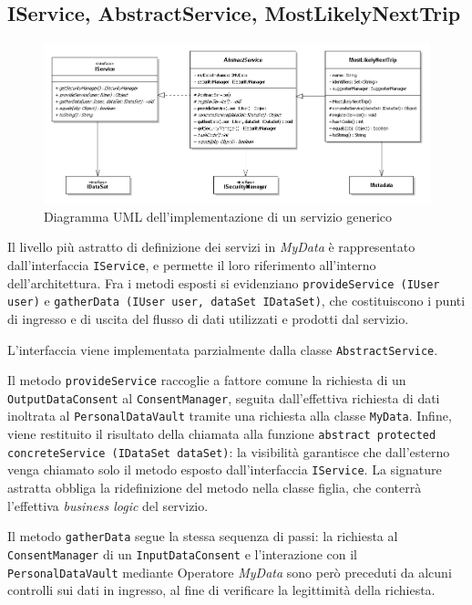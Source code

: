 \subsection{IService, AbstractService, MostLikelyNextTrip}
\begin{figure} [h]
	\includegraphics[width=\linewidth]{pictures/Services-open.png}
	\caption{Diagramma UML dell'implementazione di un servizio generico}
	\label{fig:Services-open}
\end{figure}
Il livello pi\`u astratto di definizione dei servizi in \textit{MyData} \`e rappresentato dall’interfaccia \texttt{IService}, e permette il loro riferimento all’interno dell’architettura. Fra i metodi esposti si evidenziano \texttt{provideService (IUser user)} e \texttt{gatherData (IUser user, dataSet IDataSet)}, che costituiscono i punti di ingresso e di uscita del flusso di dati utilizzati e prodotti dal servizio.

L’interfaccia viene implementata parzialmente dalla classe \texttt{AbstractService}. 

Il metodo \texttt{provideService} raccoglie a fattore comune la richiesta di un \texttt{OutputDataConsent} al \texttt{ConsentManager}, seguita dall’effettiva richiesta di dati inoltrata al \texttt{PersonalDataVault} tramite una richiesta alla classe \texttt{MyData}. Infine, viene restituito il risultato della chiamata alla funzione \texttt{abstract protected concreteService (IDataSet dataSet)}: la visibilit\`a garantisce che dall’esterno venga chiamato solo il metodo esposto dall’interfaccia \texttt{IService}. La signature astratta obbliga la ridefinizione del metodo nella classe figlia, che conterr\`a l'effettiva \textit{business logic} del servizio.

Il metodo \texttt{gatherData} segue la stessa sequenza di passi: la richiesta al \texttt{ConsentManager} di un \texttt{InputDataConsent} e l’interazione con il \texttt{PersonalDataVault} mediante Operatore \textit{MyData} sono per\`o preceduti da alcuni controlli sui dati in ingresso, al fine di verificare la legittimit\`a della richiesta.

